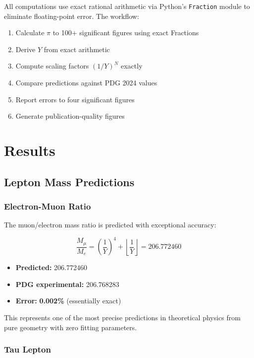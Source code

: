 \documentclass[11pt,twocolumn]{article}
\begin{document}
All computations use exact rational arithmetic via Python's \texttt{Fraction} module to eliminate floating-point error. The workflow:

\begin{enumerate}
\item Calculate $\pi$ to 100+ significant figures using exact Fractions
\item Derive $Y$ from exact arithmetic
\item Compute scaling factors $(1/Y)^N$ exactly
\item Compare predictions against PDG 2024 values
\item Report errors to four significant figures
\item Generate publication-quality figures
\end{enumerate}

\section{Results}

\subsection{Lepton Mass Predictions}

\subsubsection{Electron-Muon Ratio}

The muon/electron mass ratio is predicted with exceptional accuracy:

\begin{equation}
\frac{M_\mu}{M_e} = \left(\frac{1}{Y}\right)^4 + \left\lfloor \frac{1}{Y} \right\rfloor = 206.772460
\end{equation}

\begin{itemize}
\item \textbf{Predicted:} 206.772460
\item \textbf{PDG experimental:} 206.768283
\item \textbf{Error:} \textbf{0.002\%} (essentially exact)
\end{itemize}

This represents one of the most precise predictions in theoretical physics from pure geometry with zero fitting parameters.

\subsubsection{Tau Lepton}
\end{document}
